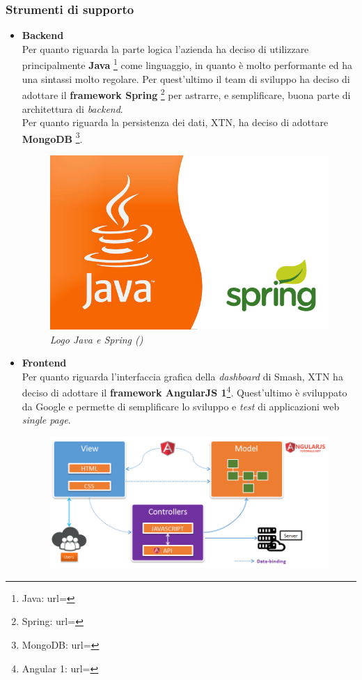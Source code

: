 \subsubsection{Strumenti di supporto}
\begin{itemize}
\item{\textbf{Backend}}\\
Per quanto riguarda la parte logica l'azienda ha deciso di utilizzare principalmente \textbf{Java} \footnote{Java: url= } come linguaggio, in quanto è molto performante ed ha una sintassi molto regolare. Per quest'ultimo il team di sviluppo ha deciso di adottare il \textbf{framework Spring} \footnote{Spring: url= } per astrarre, e semplificare, buona parte di architettura di \textit{backend}.\\
Per quanto riguarda la persistenza dei dati, XTN, ha deciso di adottare \textbf{MongoDB} \footnote{MongoDB: url= }.
\begin{figure}[ht]
	\centering
	\includegraphics[scale=0.15]{immagini/java-spring.png}
	\caption{\textit{Logo Java e Spring ()}}
\end{figure}
\newpage
\item{\textbf{Frontend}}\\
Per quanto riguarda l'interfaccia grafica della \textit{dashboard} di Smash\textregistered, XTN ha deciso di adottare il \textbf{framework AngularJS 1}\footnote{Angular 1: url= }. Quest'ultimo è sviluppato da Google e permette di semplificare lo sviluppo e \textit{test} di applicazioni web \textit{single page}.
\begin{figure}[ht]
	\centering
	\includegraphics[scale=0.3]{immagini/angular.png}

\end{figure}
\end{itemize}
